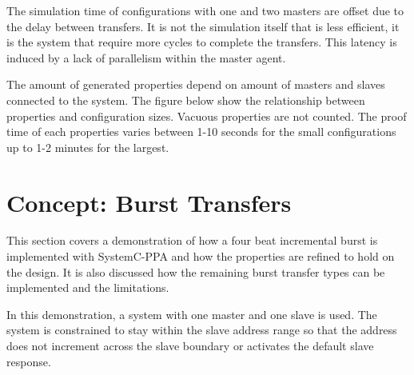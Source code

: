 The simulation time of configurations with one and two masters are offset due to the delay between transfers. It is not the simulation itself that is less efficient, it is the system that require more cycles to complete the transfers. This latency is induced by a lack of parallelism within the master agent. \par

The amount of generated properties depend on amount of masters and slaves connected to the system. The figure below show the relationship between properties and configuration sizes. Vacuous properties are not counted. The proof time of each properties varies between 1-10 seconds for the small configurations up to 1-2 minutes for the largest.


\section{Concept: Burst Transfers}
\label{sec:burst}
This section covers a demonstration of how a four beat incremental burst is implemented with SystemC-PPA and how the properties are refined to hold on the design. It is also discussed how the remaining burst transfer types can be implemented and the limitations. \par
In this demonstration, a system with one master and one slave is used. The system is constrained to stay within the slave address range so that the address does not increment across the slave boundary or activates the default slave response. 

